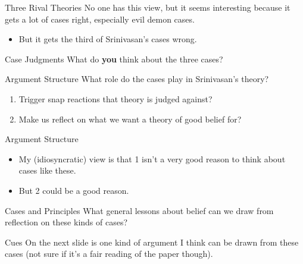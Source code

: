 \documentclass[
  17pt,
  letterpaper,
  ignorenonframetext,
  aspectratio=169,
]{beamer}
\providecommand{\tightlist}{%
  \setlength{\itemsep}{0pt}\setlength{\parskip}{0pt}}\usepackage{longtable,booktabs,array}
\begin{document}
\begin{frame}{Three Rival Theories}
\protect\hypertarget{three-rival-theories-4}{}
No one has this view, but it seems interesting because it gets a lot of
cases right, especially evil demon cases.

\begin{itemize}[<+->]
\tightlist
\item
  But it gets the third of Srinivasan's cases wrong.
\end{itemize}
\end{frame}

\begin{frame}{Case Judgments}
\protect\hypertarget{case-judgments}{}
What do \textbf{you} think about the three cases?
\end{frame}

\begin{frame}{Argument Structure}
\protect\hypertarget{argument-structure}{}
What role do the cases play in Srinivasan's theory?

\begin{enumerate}[<+->]
\tightlist
\item
  Trigger snap reactions that theory is judged against?
\item
  Make us reflect on what we want a theory of good belief for?
\end{enumerate}
\end{frame}

\begin{frame}{Argument Structure}
\protect\hypertarget{argument-structure-1}{}
\begin{itemize}[<+->]
\tightlist
\item
  My (idiosyncratic) view is that 1 isn't a very good reason to think
  about cases like these.
\item
  But 2 could be a good reason.
\end{itemize}
\end{frame}

\begin{frame}{Cases and Principles}
\protect\hypertarget{cases-and-principles}{}
What general lessons about belief can we draw from reflection on these
kinds of cases?
\end{frame}

\begin{frame}{Cues}
\protect\hypertarget{cues}{}
On the next slide is one kind of argument I think can be drawn from
these cases (not sure if it's a fair reading of the paper though).
\end{frame}
\end{document}
